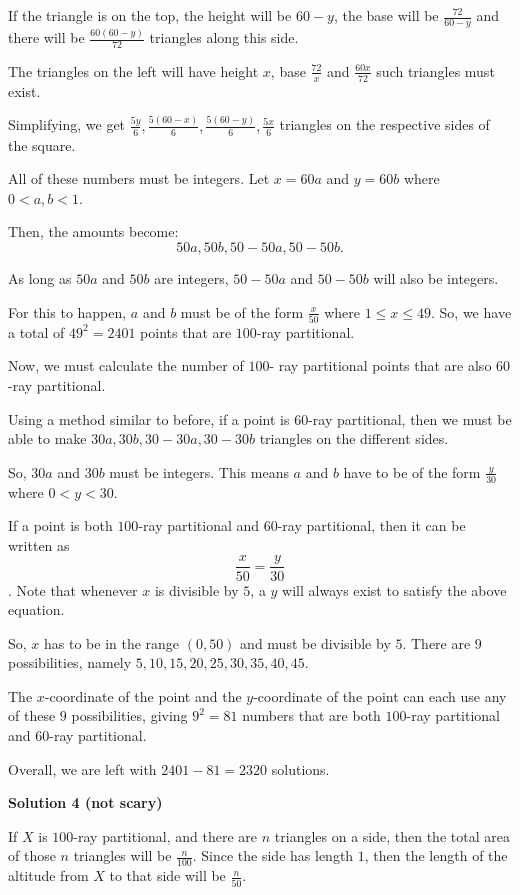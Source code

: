 \begin{enumerate}
 If the triangle is on the top, the height will be $60-y$, the base will be $\frac{72}{60-y}$ and there will be $\frac{60 (60-y)}{72}$ triangles along this side.

 The triangles on the left will have height $x$, base $\frac{72}{x}$ and $\frac{60x}{72}$ such triangles must exist. 

 Simplifying, we get $\frac{5y}{6}, \frac{5 (60-x)}{6}, \frac{5(60-y)}{6}, \frac{5x}{6}$ triangles on the respective sides of the square. 

 All of these numbers must be integers. Let $x = 60a$ and $y = 60b$ where $0 < a, b < 1.$

 
Then, the amounts become: 
 \[50a, 50b,  50 - 50a, 50 - 50b.\]

 As long as $50a$ and $50b$ are integers, $50 - 50a$ and $50 - 50b$ will also be integers. 

 For this to happen, $a$ and $b$ must be of the form $\frac{x}{50}$ where $1 \le x \le 49.$ So, we have a total of $49^2 = 2401$ points that are $100$-ray partitional. 

 Now, we must calculate the number of $100$- ray partitional points that are also $60$-ray partitional. 

 Using a method similar to before, if a point is $60$-ray partitional, then we must be able to make $30a, 30b, 30 - 30a, 30 -30b$ triangles on the different sides. 

 So, $30a$ and $30b$ must be integers. This means $a$ and $b$ have to be of the form $\frac{y}{30}$ where $0<y<30.$

 If a point is both $100$-ray partitional and $60$-ray partitional, then it can be written as 
 \[\frac{x}{50} =  \frac{y}{30}\]. Note that whenever $x$ is divisible by $5$, a $y$ will always exist to satisfy the above equation.

 So, $x$ has to be in the range $(0, 50)$ and must be divisible by $5$. There are $9$ possibilities, namely $5, 10, 15, 20, 25, 30, 35, 40, 45.$ 

 The $x$-coordinate of the point and the $y$-coordinate of the point can each use any of these $9$ possibilities, giving $9^2 = 81$ numbers that are both $100$-ray partitional and $60$-ray partitional.

 Overall, we are left with $2401 - 81 = \boxed{2320}$ solutions.

 



\textbf{Solution 4 (not scary)}

If $X$ is $100$-ray partitional, and there are $n$ triangles on a side, then the total area of those $n$ triangles will be $\frac{n}{100}$. Since the side has length $1$, then the length of the altitude from $X$ to that side will be $\frac{n}{50}$.


\end{enumerate}
